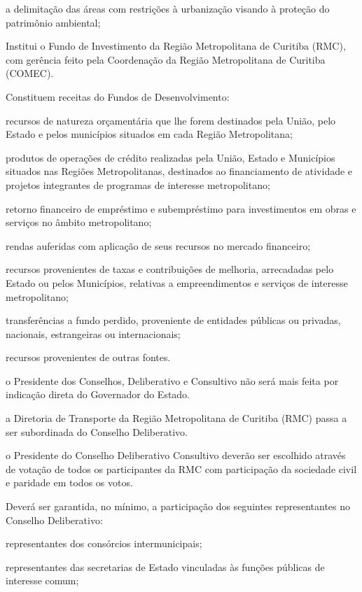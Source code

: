 \documentclass[capitulo]{br-lex-2017}
\begin{document}
		\inciso a delimitação das áreas com restrições à urbanização visando à proteção do patrimônio ambiental;
		
		\artigo Institui o Fundo de Investimento da Região Metropolitana de Curitiba (RMC), com gerência feito pela Coordenação da Região Metropolitana de Curitiba (COMEC).

\artigo Constituem receitas do Fundos de Desenvolvimento:

	\inciso recursos de natureza orçamentária que lhe forem destinados pela União, pelo Estado e pelos municípios situados em cada Região Metropolitana;
	
	\inciso produtos de operações de crédito realizadas pela União, Estado e Municípios situados nas Regiões Metropolitanas, destinados ao financiamento de atividade e projetos integrantes de programas de interesse metropolitano;
	
	\inciso retorno financeiro de empréstimo e subempréstimo para investimentos em obras e serviços no âmbito metropolitano;
	
	\inciso rendas auferidas com aplicação de seus recursos no mercado financeiro;
	
	\inciso recursos provenientes de taxas e contribuições de melhoria, arrecadadas pelo Estado ou pelos Municípios, relativas a empreendimentos e serviços de interesse metropolitano;
	
	\inciso transferências a fundo perdido, proveniente de entidades públicas ou privadas, nacionais, estrangeiras ou internacionais;
	
	\inciso recursos provenientes de outras fontes.

\artigo o Presidente dos Conselhos, Deliberativo e Consultivo não será mais feita por indicação direta do Governador do Estado.

\artigo a Diretoria de Transporte da Região Metropolitana de Curitiba (RMC) passa a ser subordinada do Conselho Deliberativo.

\artigo o Presidente do Conselho Deliberativo Consultivo deverão ser escolhido através de votação de todos os participantes da RMC com participação da sociedade civil e paridade em todos os votos.

\artigo Deverá ser garantida, no mínimo, a participação dos seguintes representantes no Conselho Deliberativo:

	\inciso representantes dos consórcios intermunicipais;
	
	\inciso representantes das secretarias de Estado vinculadas às funções públicas de interesse comum;
	
\end{document}
